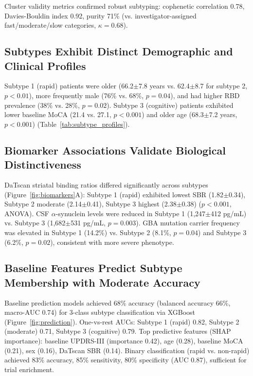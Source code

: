 Cluster validity metrics confirmed robust subtyping: cophenetic correlation 0.78, Davies-Bouldin index 0.92, purity 71\% (vs. investigator-assigned fast/moderate/slow categories, $\kappa=0.68$).

\subsection{Subtypes Exhibit Distinct Demographic and Clinical Profiles}

Subtype 1 (rapid) patients were older (66.2$\pm$7.8 years vs. 62.4$\pm$8.7 for subtype 2, $p<0.01$), more frequently male (76\% vs. 68\%, $p=0.04$), and had higher RBD prevalence (38\% vs. 28\%, $p=0.02$). Subtype 3 (cognitive) patients exhibited lower baseline MoCA (21.4 vs. 27.1, $p<0.001$) and older age (68.3$\pm$7.2 years, $p<0.001$) (Table~\ref{tab:subtype_profiles}).

\subsection{Biomarker Associations Validate Biological Distinctiveness}

DaTscan striatal binding ratios differed significantly across subtypes (Figure~\ref{fig:biomarkers}A): Subtype 1 (rapid) exhibited lowest SBR (1.82$\pm$0.34), Subtype 2 moderate (2.14$\pm$0.41), Subtype 3 highest (2.38$\pm$0.38) ($p<0.001$, ANOVA). CSF $\alpha$-synuclein levels were reduced in Subtype 1 (1,247$\pm$412 pg/mL) vs. Subtype 3 (1,682$\pm$531 pg/mL, $p=0.003$). GBA mutation carrier frequency was elevated in Subtype 1 (14.2\%) vs. Subtype 2 (8.1\%, $p=0.04$) and Subtype 3 (6.2\%, $p=0.02$), consistent with more severe phenotype\cite{alcalay2012cognitive}.

\subsection{Baseline Features Predict Subtype Membership with Moderate Accuracy}

Baseline prediction models achieved 68\% accuracy (balanced accuracy 66\%, macro-AUC 0.74) for 3-class subtype classification via XGBoost (Figure~\ref{fig:prediction}). One-vs-rest AUCs: Subtype 1 (rapid) 0.82, Subtype 2 (moderate) 0.71, Subtype 3 (cognitive) 0.79. Top predictive features (SHAP importance): baseline UPDRS-III (importance 0.42), age (0.28), baseline MoCA (0.21), sex (0.16), DaTscan SBR (0.14). Binary classification (rapid vs. non-rapid) achieved 83\% accuracy, 85\% sensitivity, 80\% specificity (AUC 0.87), sufficient for trial enrichment.

